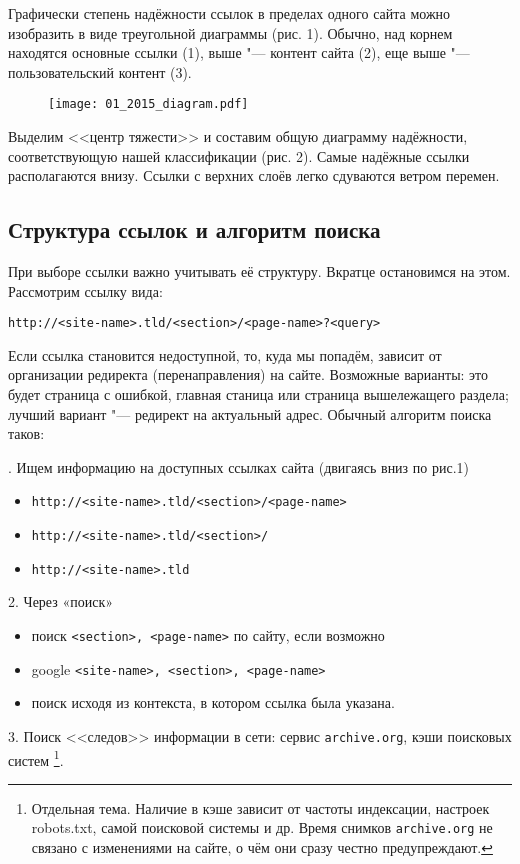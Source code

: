 \documentclass[10pt, a5paper]{article}
\begin{document}
Графически степень надёжности ссылок в пределах 
одного сайта можно изобразить в виде треугольной диаграммы (рис. 1).
Обычно, над корнем находятся основные ссылки (1), 
выше "--- контент сайта (2),
еще выше "--- пользовательский контент (3).   

\begin{figure}[h!]
  \centering
  \texttt{[image: 01\_2015\_diagram.pdf]}
\end{figure}

Выделим <<центр тяжести>> и составим общую диаграмму надёжности, 
соответствующую нашей классификации (рис. 2). 
Самые надёжные ссылки располагаются внизу. Ссылки с верхних слоёв 
легко сдуваются ветром перемен.

\subsection*{Структура ссылок и алгоритм поиска}

При выборе ссылки важно учитывать её структуру. Вкратце остановимся на этом.
Рассмотрим ссылку вида:

\texttt{http://<site-name>.tld/<section>/<page-name>?<query>}

Если ссылка становится недоступной, то, куда мы попадём,  зависит  от
организации  редиректа   (перенаправления)   на   сайте.   Возможные
варианты: это  будет  страница с ошибкой,  главная  станица  или
страница  вышележащего  раздела;  лучший  вариант  "---   редирект   на
актуальный адрес. Обычный алгоритм поиска таков:

. Ищем информацию на доступных ссылках сайта (двигаясь вниз по рис.1)
\begin{itemize}
\item \texttt{http://<site-name>.tld/<section>/<page-name>}
\item \texttt{http://<site-name>.tld/<section>/}
\item \texttt{http://<site-name>.tld}
\end{itemize}
2. Через «поиск»
\begin{itemize}
\item поиск \texttt{<section>, <page-name>} по сайту, если возможно
\item google \texttt{<site-name>, <section>, <page-name>}
\item поиск исходя из контекста, в котором ссылка была указана.
\end{itemize}
3. Поиск <<следов>> информации в сети: сервис 
\texttt{archive.org}, кэши поисковых систем 
\footnote{Отдельная тема. Наличие в кэше зависит 
от частоты индексации, настроек robots.txt, самой поисковой системы и др.
Время снимков \texttt{archive.org} не связано с изменениями на сайте, о чём они 
сразу честно предупреждают.}.
\end{document}
